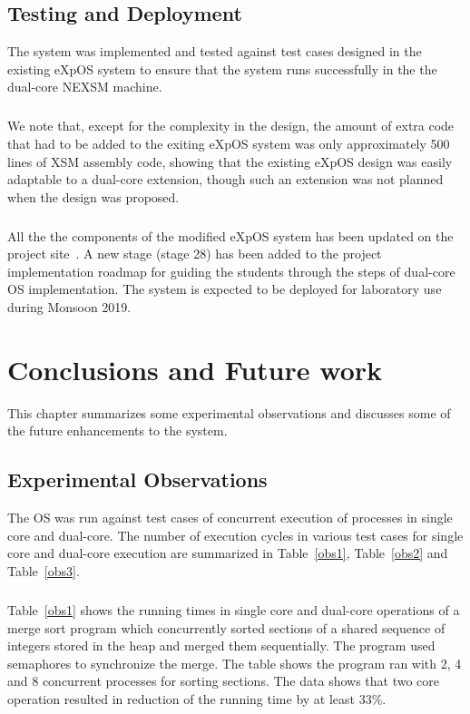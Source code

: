 \documentclass[12pt]{report}
\begin{document}
\section{Testing and Deployment}
The system was implemented and tested against test cases designed in the existing eXpOS system to ensure that the system runs successfully in the the dual-core NEXSM machine.  

\paragraph{}
We note that, except for the complexity in the design, the amount of extra code that had to be added to the exiting eXpOS system was only approximately 500 lines of XSM assembly code, showing that the existing eXpOS design was easily adaptable to a dual-core extension, though such an extension was not planned when the design was proposed.  

\paragraph{}
All the the components of the modified eXpOS system has been updated on the project site~\cite{expos}. A new stage (stage 28) has been added to the project implementation roadmap for guiding the students through the steps of dual-core OS implementation. The system is expected to be deployed for laboratory use during Monsoon 2019.  


\chapter{Conclusions and Future work}
This chapter summarizes some experimental observations and discusses some of the future enhancements to the system.  

\section{Experimental Observations}
The OS was run against test cases of concurrent execution of processes in single core and dual-core. The number of execution cycles in various test cases for single core and dual-core execution are summarized in Table~\ref{obs1}, Table~\ref{obs2} and Table~\ref{obs3}.

\paragraph{}
Table~\ref{obs1} shows the running times in single core and dual-core operations of a merge sort program which concurrently sorted sections of a shared sequence of integers stored in the heap and merged them sequentially. The program used semaphores to synchronize the merge. The table shows the program ran with 2, 4 and 8 concurrent processes for sorting sections. The data shows that two core operation resulted in reduction of the running time by at least 33\%.
\end{document}
